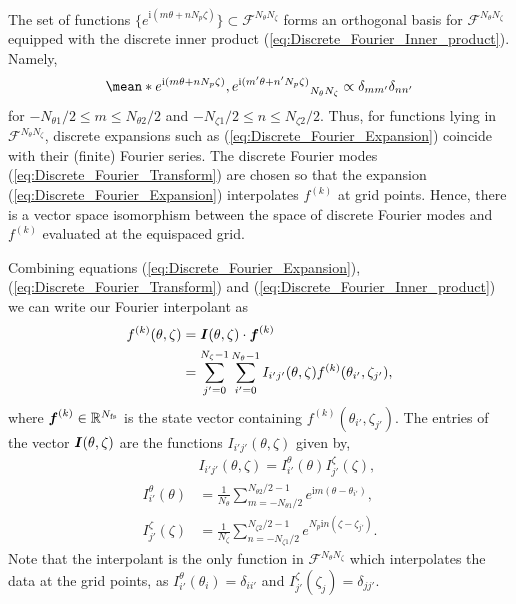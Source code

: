 \documentclass[10pt]{iopart}
\newcommand{\ii}{\text{i}}
\begin{document}
 The set of functions $\{e^{\ii(m\theta + nN_p\zeta)}\}\subset \mathcal{F}^{N_\theta N_\zeta}$ forms an orthogonal basis for $\mathcal{F}^{N_\theta N_\zeta}$ equipped with the discrete inner product (\ref{eq:Discrete_Fourier_Inner_product}). Namely, 
 \begin{align}
 	\mean*{e^{\ii(m\theta + nN_{p}\zeta)},e^{\ii(m'\theta + n'N_{p}\zeta)}}_{N_\theta N_\zeta} 
 	\propto
 	\delta_{mm'}\delta_{nn'}
 \end{align}
 for $-N_{\theta 1}/2\le m \le N_{\theta 2}/2$ and $-N_{\zeta 1}/2\le n \le N_{\zeta 2}/2$. Thus, for functions lying in $\mathcal{F}^{N_\theta N_\zeta}$, discrete expansions such as (\ref{eq:Discrete_Fourier_Expansion}) coincide with their (finite) Fourier series. The discrete Fourier modes (\ref{eq:Discrete_Fourier_Transform}) are chosen so that the expansion (\ref{eq:Discrete_Fourier_Expansion}) interpolates $f^{(k)}$ at grid points. Hence, there is a vector space isomorphism between the space of discrete Fourier modes and $f^{(k)}$ evaluated at the equispaced grid. 
 
 
 Combining equations (\ref{eq:Discrete_Fourier_Expansion}), (\ref{eq:Discrete_Fourier_Transform}) and (\ref{eq:Discrete_Fourier_Inner_product}) we can write our Fourier interpolant as
 \begin{align}
 	f^{(k)}(\theta,\zeta) 
 	& = 
 	\vb*{I}(\theta,\zeta) \cdot \vb*{f}^{(k)}
 	\nonumber
 	\\
 	& =
 	\sum_{j'=0}^{N_{\zeta}-1}
 	\sum_{i'=0}^{N_{\theta}-1}
 	I_{i'j'}(\theta,\zeta)
 	f^{(k)}(\theta_{i'},\zeta_{j'})
 	,
 	\label{eq:Fourier_interpolant}
 \end{align}
 where $\vb*{f}^{(k)}\in\mathbb{R}^{N_{\text{fs}}}$ is the state vector containing $f^{(k)}(\theta_{i'},\zeta_{j'})$. The entries of the vector $\vb*{I}(\theta,\zeta)$ are the functions $I_{i'j'}(\theta,\zeta)$ given by, 
 \begin{align}
 	& I_{i'j'}(\theta,\zeta)
 	=
 	I_{i'}^\theta(\theta)
 	I_{j'}^\zeta(\zeta),
 	\\
 	I_{i'}^{\theta}(\theta) &= 
 	\frac{1}{N_\theta}
 	\sum_{m=-N_{\theta1}/2}^{N_{\theta2}/2-1}
 	e^{{ \ii m (\theta-\theta_{i'})} },
 	\\
 	I_{j'}^{\zeta}(\zeta) &= 
 	\frac{1}{N_\zeta}
 	\sum_{n=-N_{\zeta1}/2}^{N_{\zeta2}/2-1}
 	e^{{ N_p\ii n (\zeta-\zeta_{j'})} }
 	.
 \end{align}
 Note that the interpolant is the only function in $\mathcal{F}^{N_\theta N_\zeta}$ which interpolates the data at the grid points, as $I_{i'}^\theta(\theta_i)=\delta_{ii'}$ and $I_{j'}^\zeta(\zeta_j)=\delta_{jj'}$. 
 
\end{document}
